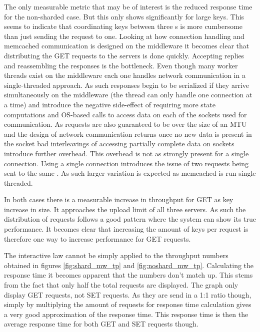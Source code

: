         The only measurable metric that may be of interest is the reduced response time for the non-sharded case. But
        this only shows significantly for large keys. This seems to indicate that coordinating keys between three
        \srv{}s is more cumbersome than just sending the request to one. Looking at how connection handling and
        memcached communication is designed on the middleware it becomes clear that distributing the GET requests to the
        servers is done quickly. Accepting replies and reassembling the responses is the bottleneck. Even though many
        worker threads exist on the middleware each one handles network communication in a single-threaded approach. As
        such responses begin to be serialized if they arrive simultaneously on the middleware (the thread can only
        handle one connection at a time) and introduce the negative side-effect of requiring more state computations and
        OS-based calls to access data on each of the sockets used for communication. As requests are also guaranteed to
        be over the size of an MTU and the design of network communication returns once no new data is present in the
        socket bad interleavings of accessing partially complete data on sockets introduce further overhead. This
        overhead is not as strongly present for a single connection. Using a single connection introduces the issue of
        two requests being sent to the same \srv{}. As such larger variation is expected as memcached is run single
        threaded.

        In both cases there is a measurable increase in throughput for GET as key increase in size. It approaches the
        upload limit of all three servers. As such the distribution of requests follows a good pattern where the system
        can show its true performance. It becomes clear that increasing the amount of keys per request is therefore one
        way to increase performance for GET requests.

        The interactive law cannot be simply applied to the throughput numbers obtained in figures \ref{fig:shard_mw_tp}
        and \ref{fig:noshard_mw_tp}. Calculating the response time it becomes apparent that the numbers don't match up.
        This stems from the fact that only half the total requests are displayed. The graph only display GET requests,
        not SET requests. As they are send in a 1:1 ratio though, simply by multiplying the amount of requests for
        response time calculation gives a very good approximation of the response time. This response time is then the
        average response time for both GET and SET requests though.
